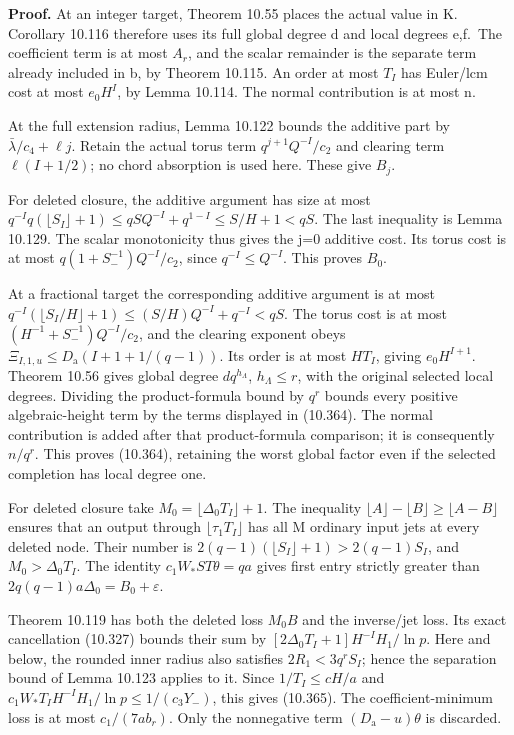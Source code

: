 \documentclass[
  11pt,
  a4paper,
]{article}
\begin{document}
\textbf{Proof.} At an integer target, Theorem 10.55 places the actual
value in K. Corollary 10.116 therefore uses its full global degree d and
local degrees e,f.~The coefficient term is at most \(A_r\), and the
scalar remainder is the separate term already included in b, by Theorem
10.115. An order at most \(T_I\) has Euler/lcm cost at most \(e_0H^I\),
by Lemma 10.114. The normal contribution is at most n.

At the full extension radius, Lemma 10.122 bounds the additive part by
\(\bar\lambda/c_4+\ell j\). Retain the actual torus term
\(q^{j+1}Q^{-I}/c_2\) and clearing term \(\ell(I+1/2)\); no chord
absorption is used here. These give \(B_j\).

For deleted closure, the additive argument has size at most
\(q^{-I}q(\lfloor S_I\rfloor+1)\le qSQ^{-I}+q^{1-I}\le S/H+1<qS\). The
last inequality is Lemma 10.129. The scalar monotonicity thus gives the
j=0 additive cost. Its torus cost is at most
\(q(1+S_-^{-1})Q^{-I}/c_2\), since \(q^{-I}\le Q^{-I}\). This proves
\(B_0\).

At a fractional target the corresponding additive argument is at most
\(q^{-I}(\lfloor S_I/H\rfloor+1)\le(S/H)Q^{-I}+q^{-I}<qS\). The torus
cost is at most \((H^{-1}+S_-^{-1})Q^{-I}/c_2\), and the clearing
exponent obeys \(\Xi_{I,1,u}\le D_{\mathrm a}(I+1+1/(q-1))\). Its order
is at most \(HT_I\), giving \(e_0H^{I+1}\). Theorem 10.56 gives global
degree \(dq^{h_\Lambda}\), \(h_\Lambda\le r\), with the original
selected local degrees. Dividing the product-formula bound by \(q^r\)
bounds every positive algebraic-height term by the terms displayed in
(10.364). The normal contribution is added after that product-formula
comparison; it is consequently \(n/q^r\). This proves (10.364),
retaining the worst global factor even if the selected completion has
local degree one.

For deleted closure take \(M_0=\lfloor\Delta_0T_I\rfloor+1\). The
inequality \(\lfloor A\rfloor-\lfloor B\rfloor\ge\lfloor A-B\rfloor\)
ensures that an output through \(\lfloor\tau_1T_I\rfloor\) has all M
ordinary input jets at every deleted node. Their number is
\(2(q-1)(\lfloor S_I\rfloor+1)>2(q-1)S_I\), and \(M_0>\Delta_0T_I\). The
identity \(c_1W_*ST\theta=qa\) gives first entry strictly greater than
\(2q(q-1)a\Delta_0=B_0+\varepsilon\).

Theorem 10.119 has both the deleted loss \(M_0B\) and the inverse/jet
loss. Its exact cancellation (10.327) bounds their sum by
\([2\Delta_0T_I+1]H^{-I}H_1/\ln p\). Here and below, the rounded inner
radius also satisfies \(2R_1<3q^rS_I\); hence the separation bound of
Lemma 10.123 applies to it. Since \(1/T_I\le cH/a\) and
\(c_1W_*T_IH^{-I}H_1/\ln p\le1/(c_3Y_-)\), this gives (10.365). The
coefficient-minimum loss is at most \(c_1/(7ab_r)\). Only the
nonnegative term \((D_{\mathrm a}-u)\theta\) is discarded.
\end{document}
